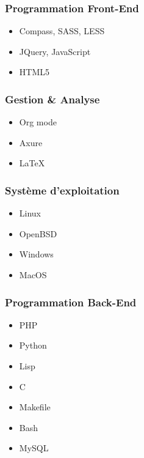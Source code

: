 \documentclass{resume}
\begin{document}
\begin{multicols}{2}
		{\setlength\multicolsep{0pt}
		 \begin{multicols}{2}
			\subsubsection*{Programmation Front-End}
			\begin{itemize}
				\scriptsize
				\item Compass, SASS, LESS
				\item JQuery, JavaScript
				\item HTML5
			\end{itemize}

			\subsubsection*{Gestion \& Analyse}
			\begin{itemize}
				\scriptsize
				\item Org mode
				\item Axure
				\item LaTeX
			\end{itemize}

			\subsubsection*{Système d'exploitation}
			\begin{itemize}
				\scriptsize
				\item Linux
				\item OpenBSD
				\item Windows
				\item MacOS
			\end{itemize}

			\columnbreak

			\subsubsection*{Programmation Back-End}
			\begin{itemize}
				\scriptsize
				\item PHP
				\item Python
				\item Lisp
				\item C
				\item Makefile
				\item Bash
				\item MySQL
			\end{itemize}


\end{multicols}}
\end{multicols}
\end{document}
